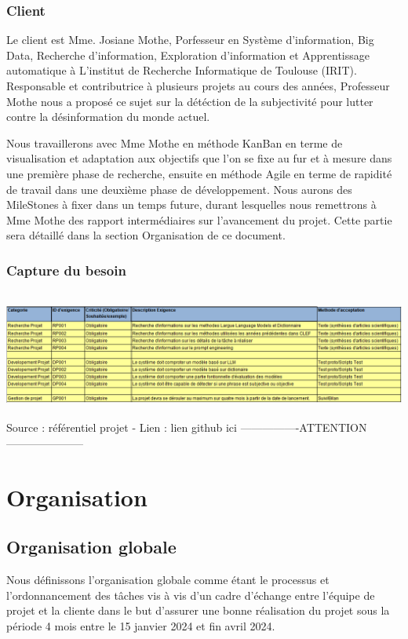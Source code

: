 \documentclass[11pt]{rapport_class}
\begin{document}
\subsection{Client}
Le client est Mme. Josiane Mothe, Porfesseur en Système d'information, Big Data, Recherche d'information, Exploration d'information et Apprentissage automatique à L'institut de Recherche Informatique de Toulouse (IRIT). Responsable et contributrice à plusieurs projets au cours des années, Professeur Mothe nous a proposé ce sujet sur la détéction de la subjectivité pour lutter contre la désinformation du monde actuel.

Nous travaillerons avec Mme Mothe en méthode KanBan en terme de visualisation et adaptation aux objectifs que l'on se fixe au fur et à mesure dans une première phase de recherche, ensuite en méthode Agile en terme de rapidité de travail dans une deuxième phase de développement.
Nous aurons des MileStones à fixer dans un temps future, durant lesquelles nous remettrons à Mme Mothe des rapport intermédiaires sur l'avancement du projet. Cette partie sera détaillé dans la section Organisation de ce document.

\subsection{Capture du besoin}
\begin{center}
\includegraphics[height=4.2cm]{capture_besoin.png}\\
\tiny
 Source : référentiel projet - Lien : lien github ici ----------------ATTENTION---------------------
\end{center}

\chapter{Organisation}
\section{Organisation globale}
Nous définissons l'organisation globale comme étant le processus et l'ordonnancement des tâches vis à vis d'un cadre d'échange entre l'équipe de projet et la cliente dans le but d'assurer une bonne réalisation du projet sous la période 4 mois entre le 15 janvier 2024 et fin avril 2024.
\end{document}
